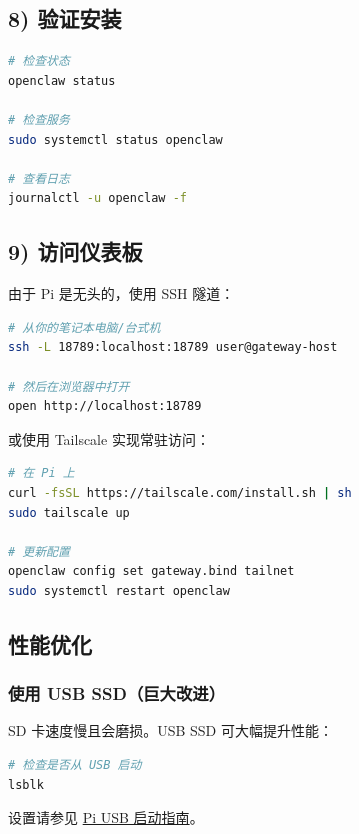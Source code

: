 \subsection{8) 验证安装}


\begin{lstlisting}[language=bash]
# 检查状态
openclaw status

# 检查服务
sudo systemctl status openclaw

# 查看日志
journalctl -u openclaw -f
\end{lstlisting}


\subsection{9) 访问仪表板}


由于 Pi 是无头的，使用 SSH 隧道：

\begin{lstlisting}[language=bash]
# 从你的笔记本电脑/台式机
ssh -L 18789:localhost:18789 user@gateway-host

# 然后在浏览器中打开
open http://localhost:18789
\end{lstlisting}


或使用 Tailscale 实现常驻访问：

\begin{lstlisting}[language=bash]
# 在 Pi 上
curl -fsSL https://tailscale.com/install.sh | sh
sudo tailscale up

# 更新配置
openclaw config set gateway.bind tailnet
sudo systemctl restart openclaw
\end{lstlisting}


\hrulefill


\subsection{性能优化}


\subsubsection{使用 USB SSD（巨大改进）}


SD 卡速度慢且会磨损。USB SSD 可大幅提升性能：

\begin{lstlisting}[language=bash]
# 检查是否从 USB 启动
lsblk
\end{lstlisting}


设置请参见 \href{https://www.raspberrypi.com/documentation/computers/raspberry-pi.html\#usb-mass-storage-boot}{Pi USB 启动指南}。

